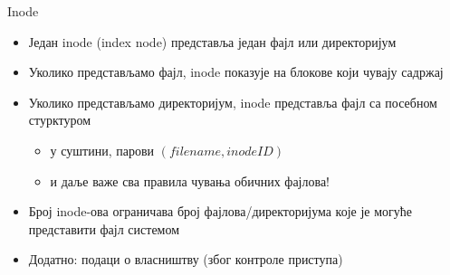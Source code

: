 \documentclass[xcolor=table]{beamer}
\begin{document}
    \begin{frame}[allowframebreaks]{Inode}
        \begin{itemize}
            \item Један inode (index node) представља један фајл или директоријум
            \item Уколико представљамо фајл, inode показује на блокове који чувају садржај
            \item Уколико представљамо директоријум, inode представља фајл са посебном стурктуром
            \begin{itemize}
                \item у суштини, парови \begin{math}(filename, inode ID)\end{math}
                \item и даље важе сва правила чувања обичних фајлова!
            \end{itemize}
            \item Број inode-ова ограничава број фајлова/директоријума које је могуће представити фајл системом
            \item Додатно: подаци о власништву (због контроле приступа)
        \end{itemize}
        
        \framebreak
        

\end{frame}
\end{document}
